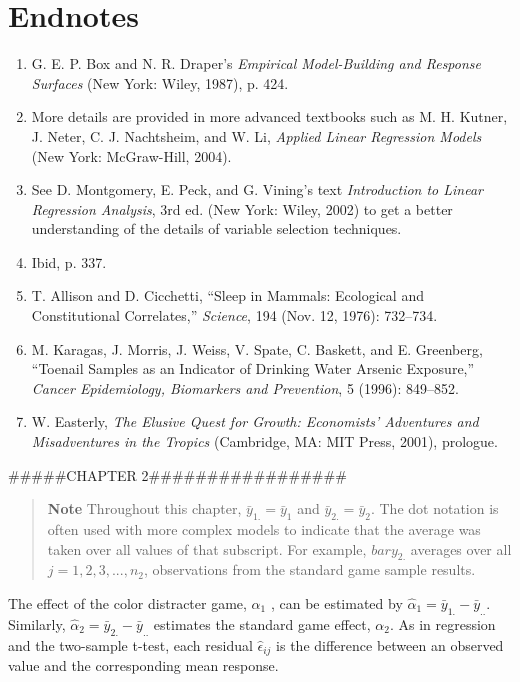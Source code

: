 \documentclass[
]{report}
\begin{document}
\section*{\texorpdfstring{\textbf{Endnotes}}{Endnotes}}\label{endnotes-1}

\begin{enumerate}
  \item G. E. P. Box and N. R. Draper’s \textit{Empirical Model-Building and Response Surfaces} (New York: Wiley, 1987), p. 424.
  \item More details are provided in more advanced textbooks such as M. H. Kutner, J. Neter, C. J. Nachtsheim, and W. Li, \textit{Applied Linear Regression Models} (New York: McGraw-Hill, 2004).
  \item See D. Montgomery, E. Peck, and G. Vining’s text \textit{Introduction to Linear Regression Analysis}, 3rd ed. (New York: Wiley, 2002) to get a better understanding of the details of variable selection techniques.
  \item Ibid, p. 337.
  \item T. Allison and D. Cicchetti, “Sleep in Mammals: Ecological and Constitutional Correlates,” \textit{Science}, 194 (Nov. 12, 1976): 732–734.
  \item M. Karagas, J. Morris, J. Weiss, V. Spate, C. Baskett, and E. Greenberg, “Toenail Samples as an Indicator of Drinking Water Arsenic Exposure,” \textit{Cancer Epidemiology, Biomarkers and Prevention}, 5 (1996): 849–852.
  \item W. Easterly, \textit{The Elusive Quest for Growth: Economists’ Adventures and Misadventures in the Tropics} (Cambridge, MA: MIT Press, 2001), prologue.
\end{enumerate}

\#\#\#\#\#CHAPTER 2\#\#\#\#\#\#\#\#\#\#\#\#\#\#\#\#\#

\begin{quote}
\textbf{Note}
Throughout this chapter, \(\bar{y}_{1.} = \bar{y}_{1}\) and \(\bar{y}_{2.} = \bar{y}_{2}\). The dot notation is often used with more complex models
to indicate that the average was taken over all values of that subscript. For example, \(bar{y}_{2.}\) averages over all
\(j = 1, 2, 3, ... , n_2\), observations from the standard game sample results.
\end{quote}

The effect of the color distracter game, \(\alpha_1\) , can be estimated by \(\hat{\alpha}_1 = \bar{y}_{1.} - \bar{y}_{..}\). Similarly, \(\hat{\alpha}_2 = \bar{y}_{2.} - \bar{y}_{..}\)
estimates the standard game effect, \(\alpha_2\). As in regression and the two-sample t-test, each residual \(\hat{\epsilon}_{ij}\) is the
difference between an observed value and the corresponding mean response.
\end{document}
